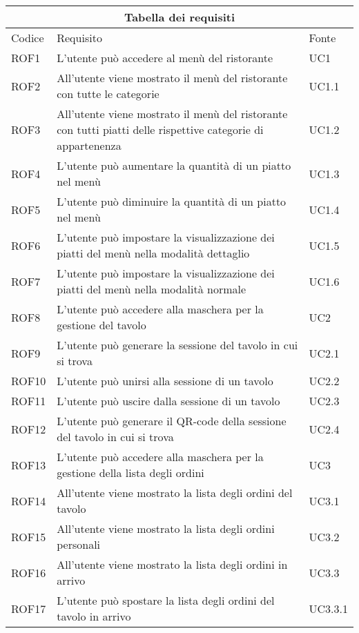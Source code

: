 \begin{center}
    \renewcommand{\arraystretch}{1.5}
    \begin{longtable}{ |p{1.5cm}|p{9cm}|p{1.5cm}|  }
        \hline
        \multicolumn{3}{|c|}{Tabella dei requisiti} \\
        \hline
        Codice&Requisito &Fonte \\
        \hline
        \endhead
        ROF1&L'utente può accedere al menù del ristorante&UC1 \\
        ROF2&All'utente viene mostrato il menù del ristorante con tutte le categorie&UC1.1 \\
        ROF3&All'utente viene mostrato il menù del ristorante con tutti piatti delle rispettive categorie di appartenenza&UC1.2 \\
        ROF4&L'utente può aumentare la quantità di un piatto nel menù&UC1.3 \\
        ROF5&L'utente può diminuire la quantità di un piatto nel menù&UC1.4 \\
        ROF6&L'utente può impostare la visualizzazione dei piatti del menù nella modalità dettaglio&UC1.5 \\
        ROF7&L'utente può impostare la visualizzazione dei piatti del menù nella modalità normale&UC1.6 \\
        ROF8&L'utente può accedere alla maschera per la gestione del tavolo &UC2 \\
        ROF9&L'utente può generare la sessione del tavolo in cui si trova&UC2.1\\
        ROF10&L'utente può unirsi alla sessione di un tavolo&UC2.2 \\
        ROF11&L'utente può uscire dalla sessione di un tavolo&UC2.3\\
        ROF12&L'utente può generare il QR-code della sessione del tavolo in cui si trova&UC2.4\\
        ROF13&L'utente può accedere alla maschera per la gestione della lista degli ordini&UC3 \\
        ROF14&All'utente viene mostrato la lista degli ordini del tavolo&UC3.1 \\
        ROF15&All'utente viene mostrato la lista degli ordini personali &UC3.2 \\
        ROF16&All'utente viene mostrato la lista degli ordini in arrivo&UC3.3 \\
        ROF17&L'utente può spostare la lista degli ordini del tavolo in arrivo &UC3.3.1 \\

\end{longtable}
\end{center}
